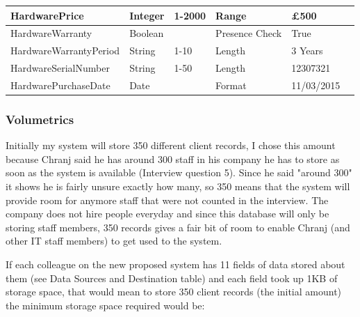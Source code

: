 \begin{table}[H]
{\begin{tabular}{|p{4cm}|p{2cm}|p{2cm}|p{3cm}|p{3cm}|p{3cm}|}
HardwarePrice                       & Integer                                 & 1-2000                               & Range                                    & £500                  &                       \\ \hline
HardwareWarranty                    & Boolean                                 &                                      & Presence Check                           & True                  &                       \\ \hline
HardwareWarrantyPeriod              & String                                  & 1-10                                 & Length                                   & 3 Years               &                       \\ \hline
HardwareSerialNumber                & String                                  & 1-50                                 & Length                                   & 12307321              &                       \\ \hline
HardwarePurchaseDate                & Date                                  &                                  & Format                                   & 11/03/2015              &                       \\ \hline
\end{tabular}
}
\end{table}

\subsubsection{Volumetrics}

Initially my system will store 350 different client records, I chose this amount because Chranj said he has around 300 staff in his company he has to store as soon as the system is available (Interview question 5). Since he said "around 300" it shows he is fairly unsure exactly how many, so 350 means that the system will provide room for anymore staff that were not counted in the interview. The company does not hire people everyday and since this database will only be storing staff members, 350 records gives a fair bit of room to enable Chranj (and other IT staff members) to get used to the system.

If each colleague on the new proposed system has 11 fields of data stored about them (see Data Sources and Destination table) and each field took up 1KB of storage space, that would mean to store 350 client records (the initial amount) the minimum storage space required would be:


